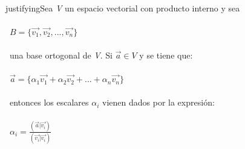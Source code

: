 \documentclass[preview]{standalone}
\begin{document}
\begin{center}
\quad\\justifyingSea \textit{V} un espacio vectorial con producto interno y sea \quad\\\ \quad\\\ $B = \{\vec{v_1}, \vec{v_2}, ..., \vec{v_n}\}$ \quad\\\ \quad\\\ una base ortogonal de \textit{V}. Si $\vec{a} \in V$ y se tiene que:\quad\\\ \quad\\\ $\vec{a} = \{\alpha_1 \vec{v_1} + \alpha_2 \vec{v_2} + ... + \alpha_n \vec{v_n} \}$ \quad\\\ \quad\\\ entonces los escalares $\alpha_i$ vienen dados por la expresión: \quad\\\ \quad\\\ $\alpha_i = \frac{(\vec{a} | \vec{v_i})}{(\vec{v_i} | \vec{v_i})} $
\end{center}
\end{document}
